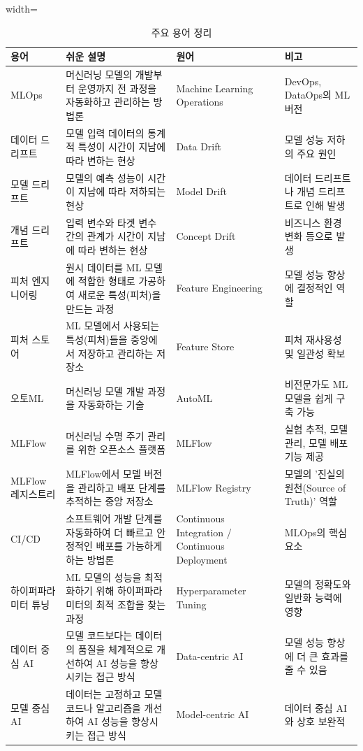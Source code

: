 \documentclass[11pt,a4paper]{article}
\begin{document}
\begin{table}[h!]
\caption{주요 용어 정리}
\label{tab:glossary}
\centering
\begin{adjustbox}{width=\textwidth}
\begin{tabular}{llll}
\toprule
\textbf{용어} & \textbf{쉬운 설명} & \textbf{원어} & \textbf{비고} \\
\midrule
MLOps & 머신러닝 모델의 개발부터 운영까지 전 과정을 자동화하고 관리하는 방법론 & Machine Learning Operations & DevOps, DataOps의 ML 버전 \\
데이터 드리프트 & 모델 입력 데이터의 통계적 특성이 시간이 지남에 따라 변하는 현상 & Data Drift & 모델 성능 저하의 주요 원인 \\
모델 드리프트 & 모델의 예측 성능이 시간이 지남에 따라 저하되는 현상 & Model Drift & 데이터 드리프트나 개념 드리프트로 인해 발생 \\
개념 드리프트 & 입력 변수와 타겟 변수 간의 관계가 시간이 지남에 따라 변하는 현상 & Concept Drift & 비즈니스 환경 변화 등으로 발생 \\
피처 엔지니어링 & 원시 데이터를 ML 모델에 적합한 형태로 가공하여 새로운 특성(피처)을 만드는 과정 & Feature Engineering & 모델 성능 향상에 결정적인 역할 \\
피처 스토어 & ML 모델에서 사용되는 특성(피처)들을 중앙에서 저장하고 관리하는 저장소 & Feature Store & 피처 재사용성 및 일관성 확보 \\
오토ML & 머신러닝 모델 개발 과정을 자동화하는 기술 & AutoML & 비전문가도 ML 모델을 쉽게 구축 가능 \\
MLFlow & 머신러닝 수명 주기 관리를 위한 오픈소스 플랫폼 & MLFlow & 실험 추적, 모델 관리, 모델 배포 기능 제공 \\
MLFlow 레지스트리 & MLFlow에서 모델 버전을 관리하고 배포 단계를 추적하는 중앙 저장소 & MLFlow Registry & 모델의 '진실의 원천(Source of Truth)' 역할 \\
CI/CD & 소프트웨어 개발 단계를 자동화하여 더 빠르고 안정적인 배포를 가능하게 하는 방법론 & Continuous Integration / Continuous Deployment & MLOps의 핵심 요소 \\
하이퍼파라미터 튜닝 & ML 모델의 성능을 최적화하기 위해 하이퍼파라미터의 최적 조합을 찾는 과정 & Hyperparameter Tuning & 모델의 정확도와 일반화 능력에 영향 \\
데이터 중심 AI & 모델 코드보다는 데이터의 품질을 체계적으로 개선하여 AI 성능을 향상시키는 접근 방식 & Data-centric AI & 모델 성능 향상에 더 큰 효과를 줄 수 있음 \\
모델 중심 AI & 데이터는 고정하고 모델 코드나 알고리즘을 개선하여 AI 성능을 향상시키는 접근 방식 & Model-centric AI & 데이터 중심 AI와 상호 보완적 \\
\bottomrule
\end{tabular}
\end{adjustbox}
\end{table}
\end{document}
